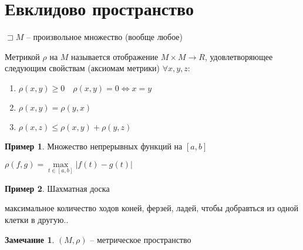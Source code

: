 \documentclass{book}
\theoremstyle{definition}
\newtheorem*{note}{Замечание}
\newtheorem*{example}{Пример}
\begin{document}
\section{Евклидово пространство}

$\sqsupset M$ -- произвольное множество (вообще любое)

\begin{definition}
    Метрикой $\rho$ на $M$ называется отображение  $M\times M \to R$, удовлетворяющее следующим свойствам (аксиомам метрики) $\forall x, y, z$:
    \begin{enumerate}
        \item $\rho(x, y) \geqslant 0\quad \rho(x, y) =0 \iff  x = y$
        \item $\rho(x, y) = \rho(y, x)$
        \item  $\rho(x, z) \leqslant \rho(x, y) + \rho(y, z)$
    \end{enumerate}
\end{definition}

\begin{example}
    Множество непрерывных функций на $[a,b]$

    $\rho(f, g) = \max\limits_{t\in [a,b]} |f(t) - g(t)|$
\end{example}

\begin{example}
    Шахматная доска


максимальное количество ходов коней, ферзей, ладей, чтобы добравться из одной клетки в другую..
\end{example}

\begin{note}
    $(M, \rho)$ -- метрическое пространство
\end{note}
\end{document}
